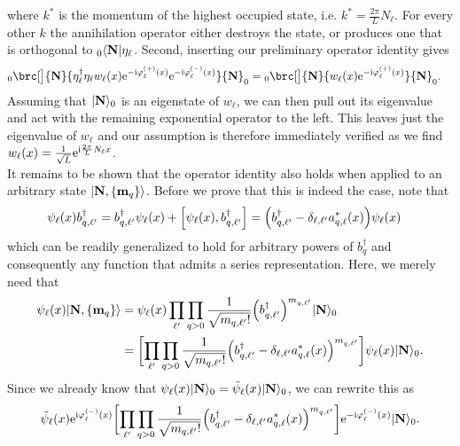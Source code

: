 where $k^\ast$ is the momentum of the highest occupied state, i.e. $k^\ast = \frac{2\pi}{L} N_\ell$.
For every other $k$ the annihilation operator either destroys the state, or produces one that is orthogonal to ${}_0\Bra{\textbf{N}}\eta_\ell$.
Second, inserting our preliminary operator identity gives
\begin{align*}
{}_0\brc[\big]{\textbf{N}}{ \eta_\ell^\dagger \eta_\ell w_\ell(x) \powe{-\i\varphi_\ell\eplus(x)} \powe{-\i\varphi_\ell\eminus(x)}}{\textbf{N}}_0 &= {}_0\brc[\big]{\textbf{N}}{ w_\ell(x) \powe{-\i\varphi_\ell\eplus(x)} }{\textbf{N}}_0.
\end{align*}
Assuming that $\Ket{\textbf{N}}_0$ is an eigenstate of $w_\ell$, we can then pull out its eigenvalue and act with the remaining exponential operator to the left.
This leaves just the eigenvalue of $w_\ell$ and our assumption is therefore immediately verified as we find $w_\ell(x) = \frac{1}{\sqrt{L}} \powe{\i \frac{2\pi}{L} N_\ell x}$.\\
It remains to be shown that the operator identity also holds when applied to an arbitrary state $\Ket{\textbf{N},\klc*{\textbf{m}_q}}$.
Before we prove that this is indeed the case, note that
\begin{align*}
\psi_\ell(x) b_{q,\ell'}^\dagger &= b_{q,\ell'}^\dagger \psi_\ell(x) + \klb*{\psi_\ell(x), b_{q,\ell'}^\dagger} = \kla*{b_{q,\ell'}^\dagger - \delta_{\ell,\ell'} a_{q,\ell}^\ast(x)} \psi_\ell(x)
\end{align*}
which can be readily generalized to hold for arbitrary powers of $b_q^\dagger$ and consequently any function that admits a series representation.
Here, we merely need that
\begin{align*}
\psi_\ell(x) \Ket{\textbf{N},\klc{\textbf{m}_q}} &= \psi_\ell(x) \prod_{\ell'} \prod_{q> 0} \frac{1}{\sqrt{m_{q,\ell'}!}} \kla*{b_{q,\ell'}^\dagger}^{m_{q,\ell'}} \Ket{\textbf{N}}_0 \\
&= \klb[\bigg]{\prod_{\ell'} \prod_{q> 0} \frac{1}{\sqrt{m_{q,\ell'}!}} \kla*{b_{q,\ell'}^\dagger - \delta_{\ell,\ell'} a_{q,\ell}^\ast(x)}^{m_{q,\ell'}}} \psi_\ell(x) \Ket{\textbf{N}}_0.
\end{align*}
Since we already know that $\psi_\ell(x) \Ket{\textbf{N}}_0 =\tilde{\psi}_\ell(x) \Ket{\textbf{N}}_0$, we can rewrite this as
\begin{align*}
\tilde{\psi}_\ell(x) \powe{\i\varphi_\ell\eminus(x)} \klb[\bigg]{\prod_{\ell'} \prod_{q> 0} \frac{1}{\sqrt{m_{q,\ell'}!}} \kla*{b_{q,\ell'}^\dagger - \delta_{\ell,\ell'} a_{q,\ell}^\ast(x)}^{m_{q,\ell'}}} \powe{-\i\varphi_\ell\eminus(x)} \Ket{\textbf{N}}_0.
\end{align*}
